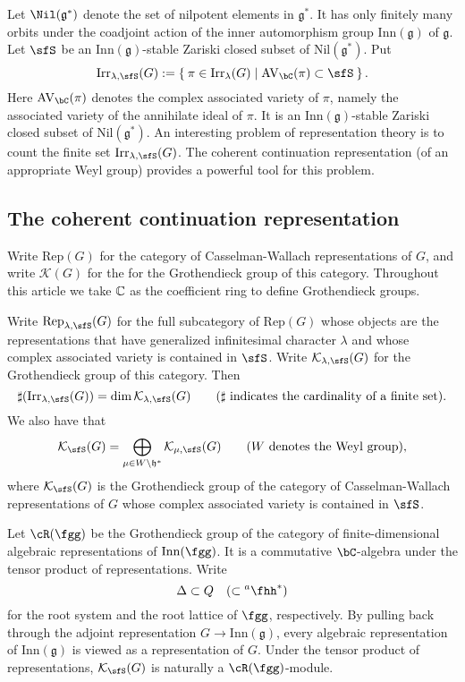 \documentclass[12pt,a4paper]{amsart}
\newcommand{\AVC}{\mathrm{AV}_\bC}
\newcommand{\CK}{{\mathcal {K}}}
\newcommand{\g}{\mathfrak g}
\newcommand{\h}{\mathfrak h}
\numberwithin{equation}{section}
\theoremstyle{remark}
\def\Irr{\mathrm{Irr}}
\def\hha{{}^a\fhh}
\newcommand{\Rg}{\cR(\fgg)}
\begin{document}
Let $\Nil(\g^*)$ denote the set of nilpotent elements in $\g^*$. It has only
finitely many orbits under the coadjoint action of the inner automorphism group
$\mathrm{Inn}(\g)$ of $\g$. Let $\sfS$ be an $\mathrm{Inn}(\g)$-stable Zariski
closed subset of $\mathrm{Nil}(\g^*)$. Put
\[
  \Irr_{\lambda,\sfS}(G):=\Set{\pi \in \Irr_{\lambda}(G)| \text{$\AVC(\pi)\subset \sfS$} }.
\]
Here $\AVC(\pi)$ denotes the complex associated variety of $\pi$, namely the
associated variety of the annihilate ideal of $\pi$. It is an
$\mathrm{Inn}(\g)$-stable Zariski closed subset of $\mathrm{Nil}(\g^*)$. An
interesting problem of representation theory is to count the finite set $\Irr_{\lambda,\sfS}(G)$. The coherent continuation
representation (of an appropriate Weyl group) provides a powerful tool for this problem.

\subsection{The coherent continuation representation}\label{sec11}


Write $\mathrm{Rep}(G)$ for the category of Casselman-Wallach representations of $G$, and write $\CK(G)$ for the for the
Grothendieck group of this category.  Throughout this article we take $\mathbb{C}$ as the coefficient ring to define  Grothendieck groups.



Write $\mathrm{Rep}_{\lambda, \sfS}(G)$ for the full subcategory of $\mathrm{Rep}(G)$ whose objects are the representations that have
generalized infinitesimal character $\lambda$ and whose complex associated
variety is contained in $\sfS$. Write $\CK_{\lambda,\sfS}(G)$ for the
Grothendieck group of this category. Then
\[
  \sharp (\Irr_{\lambda,\sfS}(G))=\dim \CK_{\lambda,\sfS}(G)\qquad(\sharp\textrm{
    indicates the cardinality of a finite set}).
\]
We also have that
\[
  \CK_\sfS(G)=\bigoplus_{\mu\in W\backslash \h^*} \CK_{\mu,\sfS}(G)\qquad (W\textrm{
    denotes the Weyl group}),
\]
where $\CK_{\sfS}(G)$ is the Grothendieck group of the
category of Casselman-Wallach representations of $G$ whose complex associated
variety is contained in $\sfS$.


Let $\Rg$ be the Grothendieck group of the category of finite-dimensional algebraic
representations of $\mathrm{Inn}(\fgg)$. It is
 a commutative $\bC$-algebra under the tensor
product of representations.
Write \[
\Delta\subset Q \quad (\subset \hha^*)
\] for the root system and the root lattice of
$\fgg$, respectively.
By pulling back through the adjoint representation
$G\rightarrow \mathrm{Inn}(\g)$, every algebraic representation of $\mathrm{Inn}(\g)$ is viewed as a representation of $G$.
Under the tensor product of representations, $\CK_\sfS(G)$ is naturally a $\Rg$-module.
\end{document}
